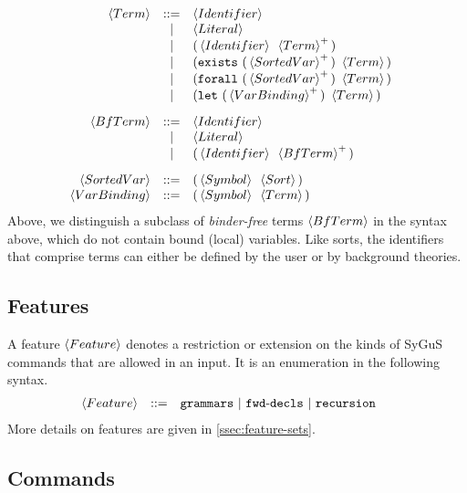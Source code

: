 \documentclass[english,a4paper,10pt]{article}
\begin{document}
\begin{alignat*}{1}
 & \begin{array}{rcl}
\left\langle Term\right\rangle & ::= & \left\langle Identifier\right\rangle\\
 & | & \left\langle Literal\right\rangle\\
 & | & {\tt (}\left\langle Identifier\right\rangle\mbox{ }\left\langle Term\right\rangle^{+}{\tt )}\\
 & | & {\tt (}{\tt exists}\mbox{ }{\tt (}\left\langle SortedVar \right\rangle^{+}{\tt )}\mbox{ }\left\langle Term\right\rangle{\tt )}\\
 & | & {\tt (}{\tt forall}\mbox{ }{\tt (}\left\langle SortedVar \right\rangle^{+}{\tt )}\mbox{ }\left\langle Term\right\rangle{\tt )}\\
 & | & {\tt (}{\tt let}\mbox{ }{\tt (}\left\langle VarBinding \right\rangle^{+}{\tt )}\mbox{ }\left\langle Term\right\rangle{\tt )}\\[2ex]
 \left\langle BfTerm\right\rangle & ::= & \left\langle Identifier\right\rangle\\
 & | & \left\langle Literal\right\rangle\\
 & | & {\tt (}\left\langle Identifier\right\rangle\mbox{ }\left\langle BfTerm\right\rangle^{+}{\tt )}\\[2ex]
 \left\langle SortedVar \right\rangle & ::= & {\tt (}\left\langle Symbol\right\rangle\mbox{ }\left\langle Sort\right\rangle{\tt )}\\
 \left\langle VarBinding \right\rangle & ::= & {\tt (}\left\langle Symbol\right\rangle\mbox{ }\left\langle Term\right\rangle{\tt )}\\
\end{array}
\end{alignat*}
Above,
we distinguish a subclass of \emph{binder-free} terms $\left\langle BfTerm\right\rangle$ in the syntax above,
which do not contain bound (local) variables.
Like sorts, the identifiers that comprise terms
can either be defined by the user or by background theories.

\subsection{Features}
\label{ssec:syntax-features}

A feature $\left\langle Feature\right\rangle$ denotes a restriction or extension
on the kinds of SyGuS commands that are allowed in an input.
It is an enumeration in the following syntax.
\begin{alignat*}{1}
 & \begin{array}{rcl}
 \left\langle Feature\right\rangle & ::= & {\tt grammars}\mbox{ }|\mbox{ }{\tt fwd\mbox{-}decls}\mbox{ }|\mbox{ }{\tt recursion}\mbox{ }
\end{array}
\end{alignat*}
More details on features are given in \cref{ssec:feature-sets}.

\subsection{Commands}
\end{document}
